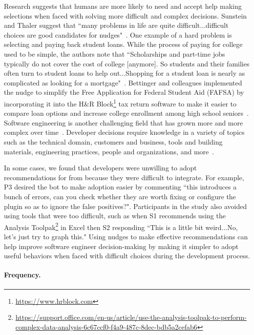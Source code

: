 Research suggests that humans are more likely to need and accept help making selections when faced with solving more difficult and complex decisions. Sunstein and Thaler suggest that ``many problems in life are quite difficult...difficult choices are good candidates for nudges"~\cite[p.~76-77]{sunstein2008nudge}. One example of a hard problem is selecting and paying back student loans. While the process of paying for college used to be simple, the authors note that ``Scholarships and part-time jobs typically do not cover the cost of college [anymore]. So students and their families often turn to student loans to help out...Shopping for a student loan is nearly as complicated as looking for a mortgage"~\cite[p.~141]{sunstein2008nudge}. Bettinger and colleagues implemented the nudge to simplify the Free Application for Federal Student Aid (FAFSA) by incorporating it into the H&R Block\footnote{\url{https://www.hrblock.com}} tax return software to make it easier to compare loan options and increase college enrollment among high school seniors~\cite{bettinger2013fafsa}. Software engineering is another challenging field that has grown more and more complex over time~\cite{SoftwareEatWorld}. Developer decisions require knowledge in a variety of topics such as the technical domain, customers and business, tools and building materials, engineering practices, people and organizations, and more~\cite{GreatSoftwareEngineer}. 

In some cases, we found that developers were unwilling to adopt recommendations for \EP from \tool because they were difficult to integrate. For example, P3 desired the bot to make adoption easier by commenting ``this introduces a bunch of errors, can you check whether they are worth fixing or configure the plugin so as to ignore the false positives?". Participants in the \peer study also avoided using tools that were too difficult, such as when S1 recommends using the Analysis Toolpak\footnote{\url{https://support.office.com/en-us/article/use-the-analysis-toolpak-to-perform-complex-data-analysis-6c67ccf0-f4a9-487c-8dec-bdb5a2cefab6}} in Excel then S2 responding ``This is a little bit weird...No, let's just try to graph this." Using nudges to make effective recommendations can help improve software engineer decision-making by making it simpler to adopt useful behaviors when faced with difficult choices during the development process.

\paragraph{Frequency.}

